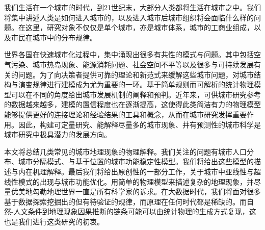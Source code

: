
\begin{cabstract}
	我们生活在一个城市的时代，到21世纪末，大部分人类都将生活在城市之中。我们将集中讲述人类是如何进入城市的，以及进入城市后城市组织将会面临什么样的问题。在这里，研究对象不仅仅是单个城市，亦是城市体系，城市的工商业组成，以及市民在城市中的分布规律。
	
	世界各国在快速城市化过程中，集中涌现出很多有共性的模式与问题。其中包括空气污染、城市热岛现象、能源消耗问题、社会空间不平等以及很多与可持续发展有关的问题。为了向决策者提供可靠的理论和新范式来缓解这些城市问题，对城市结构与演变规律进行建模成为尤为重要的一环。基于简单规则而可解析的统计物理模型可以在不同的角度给出城市发展机制的阐释和预判。近年来，可供城市研究参考的数据越来越多，建模的置信程度也在逐渐提高，这使得此类简洁有力的物理模型能够提供更好的连接理论和经验结果的工具和概念，从而在城市研究发挥重要作用。因此，构建可定量研究、能解释尽量多的城市现象、并有预测性的城市科学是城市研究中极具潜力的发展方向。
	
	本文将总结几类常见的城市地理现象的物理解释。我们关注的问题有城市人口分布、城市分隔模式、与基于位置的城市功能稳定性模型。我们将给出这些模型的描述与内在机理解释。最后我们将给出原创性的一部分工作，关于城市中亚线性与超线性模式的出现与城市功能优化。用简单的物理模型来描述复杂的地理现象，并尽量优美地勾勒地理世界一直是所有科学家的诉求。在大数据时代，我们将面对很多基于数据探索挖掘出的但有待验证的规律，而原理在任何时代都是稀缺的。而自然-人文条件到地理现象因果推断的链条可能可以由统计物理的生成方式复现，这也是我们进行这类研究的初衷。

\end{cabstract}

